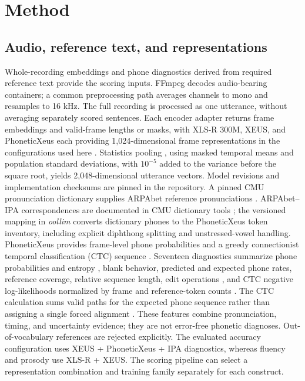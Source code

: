 \documentclass[10pt]{article}
\begin{document}
\section{Method}
\subsection{Audio, reference text, and representations}
Whole-recording embeddings and phone diagnostics derived from required reference text provide the scoring inputs. FFmpeg \cite{ffmpeg} decodes audio-bearing containers; a common preprocessing path averages channels to mono and resamples to 16 kHz. The full recording is processed as one utterance, without averaging separately scored sentences. Each encoder adapter returns frame embeddings and valid-frame lengths or masks, with XLS-R 300M, XEUS, and PhoneticXeus each providing 1,024-dimensional frame representations in the configurations used here \cite{xlsr,xeus,phonetic}. Statistics pooling \cite{pooling}, using masked temporal means and population standard deviations, with $10^{-5}$ added to the variance before the square root, yields 2,048-dimensional utterance vectors. Model revisions and implementation checksums are pinned in the repository. A pinned CMU pronunciation dictionary supplies ARPAbet reference pronunciations \cite{cmudict}. ARPAbet--IPA correspondences are documented in CMU dictionary tools \cite{cmutools}; the versioned mapping in \textit{oollim} converts dictionary phones to the PhoneticXeus token inventory, including explicit diphthong splitting and unstressed-vowel handling. PhoneticXeus provides frame-level phone probabilities and a greedy connectionist temporal classification (CTC) sequence \cite{phonetic,ctc}. Seventeen diagnostics summarize phone probabilities and entropy \cite{shannon}, blank behavior, predicted and expected phone rates, reference coverage, relative sequence length, edit operations \cite{editdistance}, and CTC negative log-likelihoods normalized by frame and reference-token counts \cite{ctc}. The CTC calculation sums valid paths for the expected phone sequence rather than assigning a single forced alignment \cite{ctc}. These features combine pronunciation, timing, and uncertainty evidence; they are not error-free phonetic diagnoses. Out-of-vocabulary references are rejected explicitly. The evaluated accuracy configuration uses XEUS + PhoneticXeus + IPA diagnostics, whereas fluency and prosody use XLS-R + XEUS. The scoring pipeline can select a representation combination and training family separately for each construct.
\end{document}
